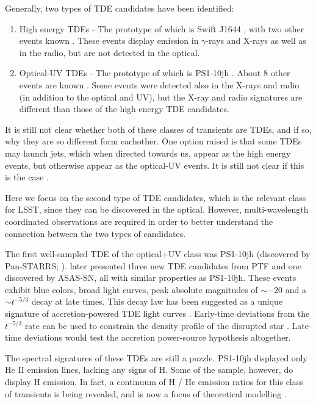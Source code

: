 Generally, two types of TDE candidates have been identified:
\begin{enumerate}
\item High energy TDEs - The prototype of which is Swift J1644 \citep{Bloom2011, Burrows2011, Levan2011, Zauderer2011}, with two
other events known \citep{Cenko2012, Brown2015}. These events display emission in $\gamma$-rays and X-rays as well as
in the radio, but are not detected in the optical. 
\item Optical-UV TDEs - The prototype of which is PS1-10jh \citep{Gezari et al. 2012}.
About $8$ other events are known \citep{Chornock2014, Arcavi2014, Holoien2014, Holoien2016, Holoien2016a}.
Some events were detected also in the X-rays and radio (in addition to the optical and UV),
but the X-ray and radio signatures are different than those of the high energy TDE candidates.
\end{enumerate}

It is still not clear whether both of these classes of transients are TDEs, 
and if so, why they are so different form eachother. One option raised is 
that some TDEs may launch jets, which when directed towards us, appear as
the high energy events, but otherwise appear as the optical-UV events.
It is still not clear if this is the case \citep[e.g.]{VanVelzen2013}.

Here we focus on the second type of TDE candidates, which is the relevant
class for LSST, since they can be discovered in the optical. However,
multi-wavelength coordinated observations are required in order to better 
understand the connection between the two types of candidates.

The first well-sampled TDE of the optical+UV class was PS1-10jh (discovered by Pan-STARRS;
\citealt{Gezari2012}). \citet{Arcavi2014} later presented three new TDE candidates
from PTF and one discovered by ASAS-SN, all with similar properties
as PS1-10jh. These events exhibit blue colors, broad light curves,
peak absolute magnitudes of $\sim-20$ and a $\sim t^{-5/3}$ decay
at late times. This decay law has been suggested as a unique signature
of accretion-powered TDE light curves \citep{Rees1988, Evans1989, Phinney1989}. 
Early-time deviations from the $t^{-5/3}$ rate
can be used to constrain the density profile of the disrupted star
\citep{Lodato2009, Gezari2012}. Late-time deviations would
test the accretion power-source hypothesis altogether. 

The spectral signatures of these TDEs are still a puzzle. PS1-10jh displayed
only He II emission lines, lacking any signs of H. Some of the \citet{Arcavi2014}
sample, however, do display H emission.
In fact, a continuum of H / He emission ratios for this class of transients
is being revealed, and is now a focus of theoretical modelling \citep{Strubbe2015, Roth2015}.

